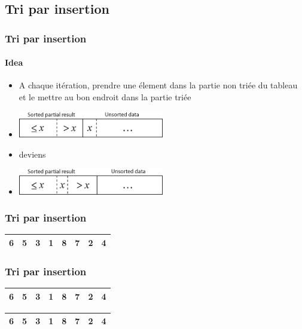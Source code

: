 \subsection[Insertion]{Tri par insertion}

\begin{frame}
\frametitle{Tri par insertion}
\framesubtitle{Idea}
\begin{itemize}
\item A chaque itération, prendre une élement dans la partie non triée du tableau et le mettre au bon endroit dans la partie triée
\item \includegraphics[width=0.5\textwidth]{./1-sorting/img/insertion_before}
\item deviens
\item \includegraphics[width=0.5\textwidth]{./1-sorting/img/insertion_after}
\end{itemize}
\end{frame}

\begin{frame}
\frametitle{Tri par insertion}
\begin{table}
\begin{tabular}{| c | c | c | c | c | c | c | c |}
\hline
6 & 5 & 3 & 1 & 8 & 7 & 2 & 4 \\ 
\hline
\end{tabular}
\end{table}
\end{frame}

\begin{frame}
\frametitle{Tri par insertion}
\begin{table}
\begin{tabular}{| c | c | c | c | c | c | c | c |}
\hline
\cellcolor{red!25}6 & 5 & 3 & 1 & 8 & 7 & 2 & 4 \\ 
\hline
\end{tabular}
\end{table}
\begin{table}
\begin{tabular}{| c | c | c | c | c | c | c | c |}
\hline
\cellcolor{blue!25}6 & 5 & 3 & 1 & 8 & 7 & 2 & 4 \\ 
\hline
\end{tabular}
\end{table}
\end{frame}

